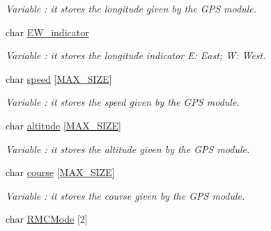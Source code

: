 \begin{DoxyCompactItemize}
\begin{DoxyCompactList}\small\item\em Variable \+: it stores the longitude given by the G\+PS module. \end{DoxyCompactList}\item 
char \hyperlink{class_wasp_g_p_s_a681c1aab0b428071b066b84b437712b5}{E\+W\+\_\+indicator}\hypertarget{class_wasp_g_p_s_a681c1aab0b428071b066b84b437712b5}{}\label{class_wasp_g_p_s_a681c1aab0b428071b066b84b437712b5}

\begin{DoxyCompactList}\small\item\em Variable \+: it stores the longitude indicator E\+: East; W\+: West. \end{DoxyCompactList}\item 
char \hyperlink{class_wasp_g_p_s_a8468653f9e32c640b9fe6ee94973cac6}{speed} \mbox{[}\hyperlink{_wasp_g_p_s_8h_a0592dba56693fad79136250c11e5a7fe}{M\+A\+X\+\_\+\+S\+I\+ZE}\mbox{]}\hypertarget{class_wasp_g_p_s_a8468653f9e32c640b9fe6ee94973cac6}{}\label{class_wasp_g_p_s_a8468653f9e32c640b9fe6ee94973cac6}

\begin{DoxyCompactList}\small\item\em Variable \+: it stores the speed given by the G\+PS module. \end{DoxyCompactList}\item 
char \hyperlink{class_wasp_g_p_s_a1f01b6cb2262fd7dba0b8ba90f46baa6}{altitude} \mbox{[}\hyperlink{_wasp_g_p_s_8h_a0592dba56693fad79136250c11e5a7fe}{M\+A\+X\+\_\+\+S\+I\+ZE}\mbox{]}\hypertarget{class_wasp_g_p_s_a1f01b6cb2262fd7dba0b8ba90f46baa6}{}\label{class_wasp_g_p_s_a1f01b6cb2262fd7dba0b8ba90f46baa6}

\begin{DoxyCompactList}\small\item\em Variable \+: it stores the altitude given by the G\+PS module. \end{DoxyCompactList}\item 
char \hyperlink{class_wasp_g_p_s_a700f5c5bda697229be8d68fe9ffe98ac}{course} \mbox{[}\hyperlink{_wasp_g_p_s_8h_a0592dba56693fad79136250c11e5a7fe}{M\+A\+X\+\_\+\+S\+I\+ZE}\mbox{]}\hypertarget{class_wasp_g_p_s_a700f5c5bda697229be8d68fe9ffe98ac}{}\label{class_wasp_g_p_s_a700f5c5bda697229be8d68fe9ffe98ac}

\begin{DoxyCompactList}\small\item\em Variable \+: it stores the course given by the G\+PS module. \end{DoxyCompactList}\item 
char \hyperlink{class_wasp_g_p_s_a5b12e0cc2563db74a1b71016537dd25c}{R\+M\+C\+Mode} \mbox{[}2\mbox{]}\hypertarget{class_wasp_g_p_s_a5b12e0cc2563db74a1b71016537dd25c}{}\label{class_wasp_g_p_s_a5b12e0cc2563db74a1b71016537dd25c}


\end{DoxyCompactItemize}
